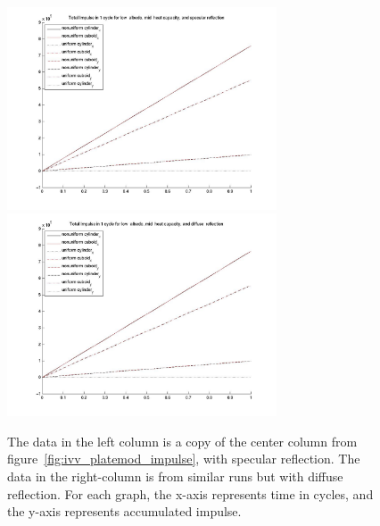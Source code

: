 \begin{description}
\begin{figure}[!ht]
     \includegraphics[width=80mm]{figs/Plate_mod/I_alb_low__HC_mid__ref_spc.jpg}
     \includegraphics[width=80mm]{figs/Plate_mod/I_alb_low__HC_mid__ref_dif.jpg}
     \caption{The data in the left column is a copy of the center column from
     figure~\ref{fig:ivv_platemod_impulse}, with specular reflection.
     The data in the right-column is from similar runs but with diffuse
     reflection.  For each graph, the x-axis represents time in cycles, and the y-axis represents accumulated impulse.}
     \label{fig:ivv_platemod_specdiff}
     \end{figure}
\clearpage


\end{description}
